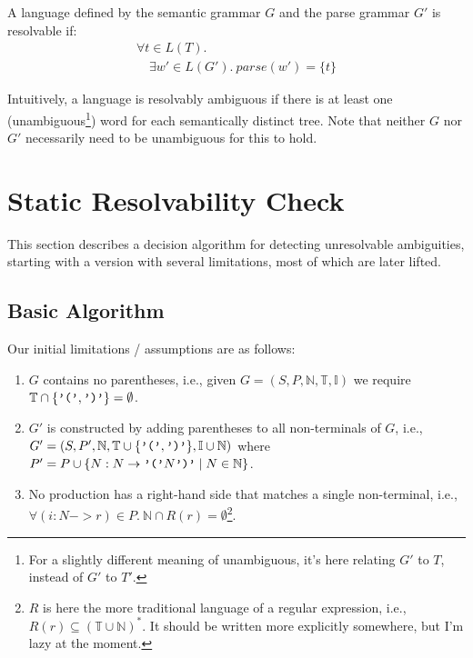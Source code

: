 \documentclass[sigplan]{acmart}\settopmatter{printfolios=true,printccs=false,printacmref=false}
\newcommand{\NT}{\mathbb{N}} %
\newcommand{\T}{\mathbb{T}} %
\newcommand{\I}{\mathbb{I}} %
\newcommand{\parse}{\mathit{parse}} %
\begin{document}
\begin{definition}
  A language defined by the semantic grammar $G$ and the parse grammar $G'$ is resolvable if:
  $$
  \begin{array}{l}
  \forall t \in L(T).\\
  \quad \exists w' \in L(G').\ \parse(w') = \{t\}
  \end{array}
  $$
\end{definition}

\noindent Intuitively, a language is resolvably ambiguous if there is at least one (unambiguous\footnote{For a slightly different meaning of unambiguous, it's here relating $G'$ to $T$, instead of $G'$ to $T'$.}) word for each semantically distinct tree. Note that neither $G$ nor $G'$ necessarily need to be unambiguous for this to hold.

\section{Static Resolvability Check}

This section describes a decision algorithm for detecting unresolvable ambiguities, starting with a version with several limitations, most of which are later lifted.

\subsection{Basic Algorithm}

Our initial limitations / assumptions are as follows:

\begin{enumerate}
  \item $G$ contains no parentheses, i.e., given $G = (S, P, \NT, \T, \I)$ we require $\T \cap \{\verb|'('|, \verb|')'|\} = \emptyset$.

  \item $G'$ is constructed by adding parentheses to all non-terminals of $G$, i.e., $G' = (S, P', \NT, \T \cup \{\verb|'('|, \verb|')'|\}, \I \cup \NT)$ where $P' = P \cup \{ N: N -> \verb|'('|N\verb|')'| \mid N \in \NT \}$.

  \item No production has a right-hand side that matches a single non-terminal, i.e., $\forall (i:N->r) \in P.\ \NT \cap R(r) = \emptyset$\footnote{$R$ is here the more traditional language of a regular expression, i.e., $R(r) \subseteq (\T \cup \NT)^{*}$. It should be written more explicitly somewhere, but I'm lazy at the moment.}.
\end{enumerate}
\end{document}
